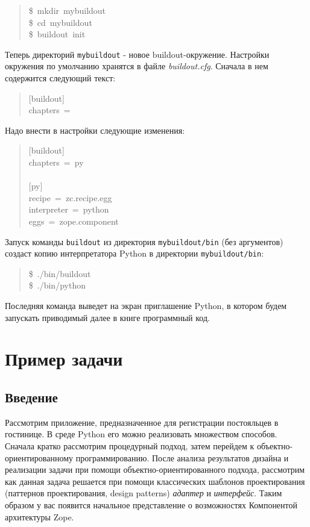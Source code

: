 \documentclass[14pt,a4paper,openany,twoside,final]{extbook}
\providecommand*{\DUroletitlereference}[1]{\textsl{#1}}
\begin{document}
\begin{quote}{\ttfamily \raggedright \noindent
\$~mkdir~mybuildout\\
\$~cd~mybuildout\\
\$~buildout~init
}
\end{quote}

Теперь директорий \texttt{mybuildout} - новое buildout-окружение.  Настройки
окружения по умолчанию хранятся в файле \DUroletitlereference{buildout.cfg}.  Сначала в нем
содержится следующий текст:

\begin{quote}{\ttfamily \raggedright \noindent
{[}buildout{]}\\
chapters~=
}
\end{quote}

Надо внести в настройки следующие изменения:

\begin{quote}{\ttfamily \raggedright \noindent
{[}buildout{]}\\
chapters~=~py\\
~\\
{[}py{]}\\
recipe~=~zc.recipe.egg\\
interpreter~=~python\\
eggs~=~zope.component
}
\end{quote}

Запуск команды \texttt{buildout} из директория \texttt{mybuildout/bin} (без
аргументов) создаст копию интерпретатора Python в директории
\texttt{mybuildout/bin}:

\begin{quote}{\ttfamily \raggedright \noindent
\$~./bin/buildout\\
\$~./bin/python
}
\end{quote}

Последняя команда выведет на экран приглашение Python, в котором
будем запускать приводимый далее в книге программный код.


\chapter{Пример задачи%
  \label{id17}%
}


\section{Введение%
  \label{id18}%
}

Рассмотрим приложение, предназначенное для регистрации постояльцев в
гостинице.  В среде Python его можно реализовать множеством способов.
Сначала кратко рассмотрим процедурный подход, затем перейдем к
объектно-ориентированному программированию.  После анализа результатов
дизайна и реализации задачи при помощи объектно-ориентированного
подхода, рассмотрим как данная задача решается при помощи классических
шаблонов проектирования (паттернов проектирования, design patterns)
\DUroletitlereference{адаптер} и \DUroletitlereference{интерфейс}.  Таким образом у вас появится начальное
представление о возможностях Компонентой архитектуры Zope.
\end{document}
